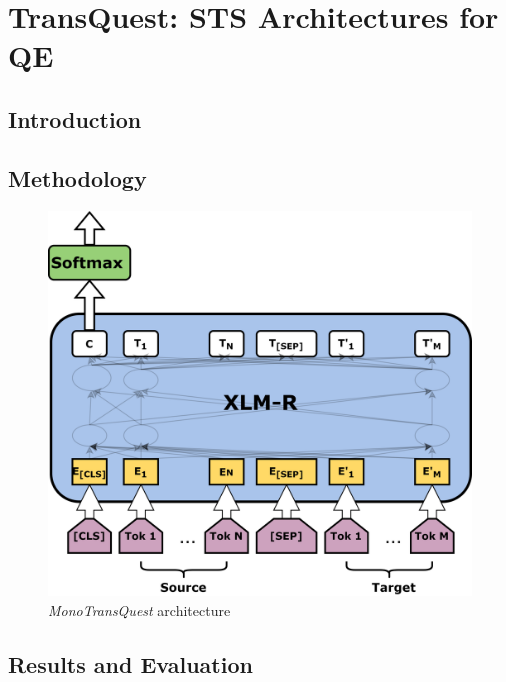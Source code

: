 \chapter{\label{cha:transquest}TransQuest: STS Architectures for QE}

\section{Introduction}
\cite{conneau-etal-2020-unsupervised} 
\section{Methodology}


\begin{figure}
	\centering
	\includegraphics[scale=0.60]{figures/translation_quality_estimation/TransQuest.png}
	\caption{\textit{MonoTransQuest} architecture}
	\label{fig:transquest_architecture}
\end{figure}


\section{Results and Evaluation}


